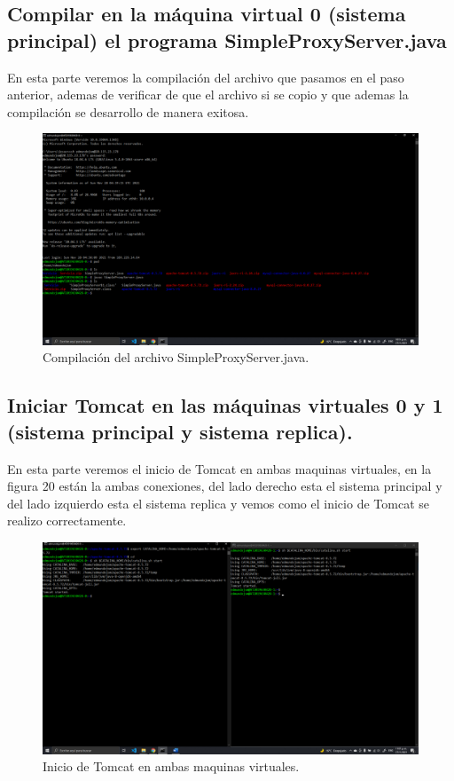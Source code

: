 \documentclass[11pt]{article}
\begin{document}
		\subsection{Compilar en la máquina virtual 0 (sistema principal) el programa SimpleProxyServer.java}
		En esta parte veremos la compilación del archivo que pasamos en el paso anterior, ademas de verificar de que el archivo si se copio y que ademas la compilación se desarrollo de manera exitosa.
		\begin{figure}[H]
			\centering
			\includegraphics[scale=0.34]{resources/p6.png}
			\caption{Compilación del archivo SimpleProxyServer.java.}\label{fig:picture}
		\end{figure}
		\subsection{Iniciar Tomcat en las máquinas virtuales 0 y 1 (sistema principal y sistema replica).}
		En esta parte veremos el inicio de Tomcat en ambas maquinas virtuales, en la figura 20 están la ambas conexiones, del lado derecho esta el sistema principal y del lado izquierdo esta el sistema replica y vemos como el inicio de Tomcat se realizo correctamente.
		\begin{figure}[H]
			\centering
			\includegraphics[scale=0.34]{resources/p7.png}
			\caption{Inicio de Tomcat en ambas maquinas virtuales.}\label{fig:picture}
		\end{figure}
\end{document}
